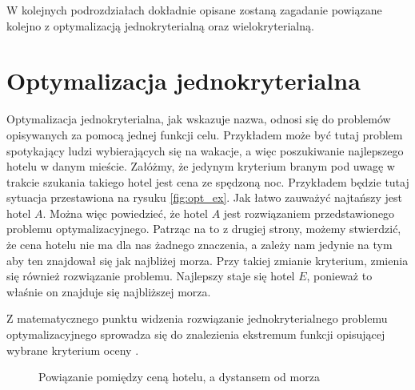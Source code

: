 \documentclass[twoside]{iisthesis}
\begin{document}
W kolejnych podrozdziałach dokładnie opisane zostaną zagadanie powiązane kolejno z optymalizacją jednokryterialną oraz wielokryterialną.
\section{Optymalizacja jednokryterialna}
Optymalizacja jednokryterialna, jak wskazuje nazwa, odnosi się do problemów opisywanych za pomocą jednej funkcji celu. Przykładem może być tutaj problem spotykający ludzi wybierających się na wakacje, a więc poszukiwanie najlepszego hotelu w danym mieście. Załóżmy, że jedynym kryterium branym pod uwagę w trakcie szukania takiego hotel jest cena ze spędzoną noc. Przykładem będzie tutaj sytuacja przestawiona na rysuku \eqref{fig:opt_ex}. Jak łatwo zauważyć najtańszy jest hotel $A$. Można więc powiedzieć, że hotel $A$ jest rozwiązaniem przedstawionego problemu optymalizacyjnego. Patrząc na to z drugiej strony, możemy stwierdzić, że cena hotelu nie ma dla nas żadnego znaczenia, a zależy nam jedynie na tym aby ten znajdował się jak najbliżej morza. Przy takiej zmianie kryterium, zmienia się również rozwiązanie problemu. Najlepszy staje się hotel $E$, ponieważ to właśnie on znajduje się najbliższej morza.

Z matematycznego punktu widzenia rozwiązanie jednokryterialnego problemu optymalizacyjnego sprowadza się do znalezienia ekstremum  funkcji opisującej wybrane kryterium oceny \cite{wiki_pl_optimization}.
\begin{figure}[!htb]
	\centering
	\caption{Powiązanie pomiędzy ceną hotelu, a dystansem od morza}
	\label{fig:opt_ex}
\end{figure}
\end{document}
